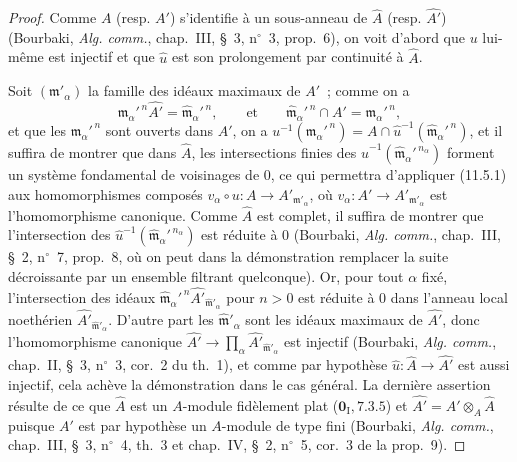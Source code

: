 \begin{proof}

Comme $A$ (resp. $A'$) s'identifie à un sous-anneau de $\widehat A$ (resp.
$\widehat{A'}$) (Bourbaki, \emph{Alg. comm.}, chap.~III, \S~3, n$^\circ$~3,
prop.~6), on voit d'abord que $u$ lui-même est injectif et que $\widehat u$ est
son prolongement par continuité à $\widehat A$.

Soit $(\mathfrak m'_\alpha)$ la famille des idéaux maximaux de $A'$~; comme on a
\[
\mathfrak m_\alpha'^{\,n}\widehat{A'}
=\widehat{\mathfrak m}_\alpha'^{\,n},
\qquad\text{et}\qquad
\widehat{\mathfrak m}_\alpha'^{\,n}\cap A'
=\mathfrak m_\alpha'^{\,n},
\]
et que les $\mathfrak m_\alpha'^{\,n}$ sont ouverts dans $A'$, on a
$u^{-1}(\mathfrak m_\alpha'^{\,n})
=A\cap\widehat u^{-1}(\widehat{\mathfrak m}_\alpha'^{\,n})$, et il suffira de
montrer que dans $\widehat A$, les intersections finies des
$\widehat u^{-1}(\widehat{\mathfrak m}_\alpha'^{\,n_\alpha})$ forment un système
fondamental de voisinages de $0$, ce qui permettra d'appliquer (11.5.1) aux
homomorphismes composés $v_\alpha\circ u:A\to A'_{\mathfrak m'_\alpha}$,
où $v_\alpha:A'\to A'_{\mathfrak m'_\alpha}$ est l'homomorphisme canonique.
Comme $\widehat A$ est complet, il suffira de montrer que l'intersection des
$\widehat u^{-1}(\widehat{\mathfrak m}_\alpha'^{\,n_\alpha})$ est réduite à
$0$ (Bourbaki, \emph{Alg. comm.}, chap.~III, \S~2, n$^\circ$~7, prop.~8, où on
peut dans la démonstration remplacer la suite décroissante par un ensemble
filtrant quelconque). Or, pour tout $\alpha$ fixé, l'intersection des idéaux
$\widehat{\mathfrak m}_\alpha'^{\,n}\widehat{A'}_{\widehat{\mathfrak m}'_\alpha}$
pour $n>0$ est réduite à $0$ dans l'anneau local noethérien
$\widehat{A'}_{\widehat{\mathfrak m}'_\alpha}$. D'autre part les
$\widehat{\mathfrak m}'_\alpha$ sont les idéaux maximaux de $\widehat{A'}$, donc
l'homomorphisme canonique
$\widehat{A'}\to\prod_\alpha\widehat{A'}_{\widehat{\mathfrak m}'_\alpha}$ est
injectif (Bourbaki, \emph{Alg. comm.}, chap.~II, \S~3, n$^\circ$~3, cor.~2 du
th.~1), et comme par hypothèse $\widehat u:\widehat A\to\widehat{A'}$ est aussi
injectif, cela achève la démonstration dans le cas général. La dernière
assertion résulte de ce que $\widehat A$ est un $A$-module fidèlement plat
($\mathbf 0_{\mathrm I},7.3.5$) et $\widehat{A'}=A'\otimes_A\widehat A$ puisque
$A'$ est par hypothèse un $A$-module de type fini (Bourbaki, \emph{Alg. comm.},
chap.~III, \S~3, n$^\circ$~4, th.~3 et chap.~IV, \S~2, n$^\circ$~5, cor.~3 de la
prop.~9).
\end{proof}

